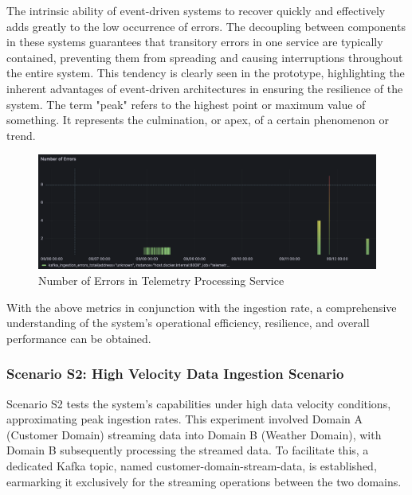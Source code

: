 \documentclass{ieeeaccess}
\begin{document}
The intrinsic ability of event-driven systems to recover quickly and effectively adds greatly to the low occurrence of errors. The decoupling between components in these systems guarantees that transitory errors in one service are typically contained, preventing them from spreading and causing interruptions throughout the entire system. This tendency is clearly seen in the prototype, highlighting the inherent advantages of event-driven architectures in ensuring the resilience of the system. The term "peak" refers to the highest point or maximum value of something. It represents the culmination, or apex, of a certain phenomenon or trend.

\begin{figure}

  \centering

  \includegraphics[width=\columnwidth]{images/number-of-errors-in-telemetry-processing-service.png}

  \caption{Number of Errors in Telemetry Processing Service}

  \label{numberOfErrorsInTelemetryProcessingService}

\end{figure}

With the above metrics in conjunction with the ingestion rate, a comprehensive understanding of the system's operational efficiency, resilience, and overall performance can be obtained.

\subsubsection{Scenario S2: High Velocity Data Ingestion Scenario}

Scenario S2 tests the system's capabilities under high data velocity conditions, approximating peak ingestion rates. This experiment involved Domain A (Customer Domain) streaming data into Domain B (Weather Domain), with Domain B subsequently processing the streamed data. To facilitate this, a dedicated Kafka topic, named customer-domain-stream-data, is established, earmarking it exclusively for the streaming operations between the two domains. 
\end{document}
